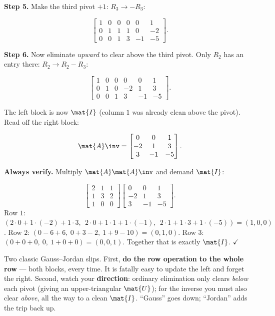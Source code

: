 \textbf{Step 5.} Make the third pivot $+1$: $R_3 \to -R_3$:

\[
\left[\begin{array}{ccc|ccc}
1 & 0 & 0 & 0 & 0 & 1 \\
0 & 1 & 1 & 1 & 0 & -2 \\
0 & 0 & 1 & 3 & -1 & -5
\end{array}\right].
\]

\textbf{Step 6.} Now eliminate \emph{upward} to clear above the third pivot. Only $R_2$
has an entry there: $R_2 \to R_2 - R_3$:

\[
\left[\begin{array}{ccc|ccc}
1 & 0 & 0 & 0 & 0 & 1 \\
0 & 1 & 0 & -2 & 1 & 3 \\
0 & 0 & 1 & 3 & -1 & -5
\end{array}\right].
\]

The left block is now $\mat{I}$ (column $1$ was already clean above the pivot). Read off
the right block:

\[
\mat{A}\inv = \begin{bmatrix} 0 & 0 & 1 \\ -2 & 1 & 3 \\ 3 & -1 & -5 \end{bmatrix}.
\]

\textbf{Always verify.} Multiply $\mat{A}\mat{A}\inv$ and demand $\mat{I}$:

\[
\begin{bmatrix} 2 & 1 & 1 \\ 1 & 3 & 2 \\ 1 & 0 & 0 \end{bmatrix}
\begin{bmatrix} 0 & 0 & 1 \\ -2 & 1 & 3 \\ 3 & -1 & -5 \end{bmatrix}.
\]
Row $1$: $(2\cdot0 + 1\cdot(-2) + 1\cdot3,\ \ 2\cdot0 + 1\cdot1 + 1\cdot(-1),\ \
2\cdot1 + 1\cdot3 + 1\cdot(-5)) = (1,0,0)$. Row $2$:
$(0 - 6 + 6,\ 0 + 3 - 2,\ 1 + 9 - 10) = (0,1,0)$. Row $3$:
$(0 + 0 + 0,\ 0,\ 1 + 0 + 0) = (0,0,1)$. Together that is exactly $\mat{I}$. $\checkmark$

\begin{trapbox}
Two classic Gauss--Jordan slips. First, \textbf{do the row operation to the whole row} ---
both blocks, every time. It is fatally easy to update the left and forget the right.
Second, watch your \textbf{direction}: ordinary elimination only clears \emph{below} each
pivot (giving an upper-triangular $\mat{U}$); for the inverse you must also clear
\emph{above}, all the way to a clean $\mat{I}$. ``Gauss'' goes down; ``Jordan'' adds the
trip back up.
\end{trapbox}

